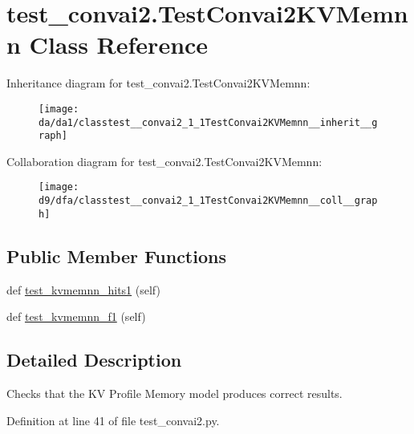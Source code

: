 \hypertarget{classtest__convai2_1_1TestConvai2KVMemnn}{}\section{test\+\_\+convai2.\+Test\+Convai2\+K\+V\+Memnn Class Reference}
\label{classtest__convai2_1_1TestConvai2KVMemnn}


Inheritance diagram for test\+\_\+convai2.\+Test\+Convai2\+K\+V\+Memnn\+:\nopagebreak
\begin{figure}[H]
\begin{center}
\leavevmode
\texttt{[image: da/da1/classtest\_\_convai2\_1\_1TestConvai2KVMemnn\_\_inherit\_\_graph]}
\end{center}
\end{figure}


Collaboration diagram for test\+\_\+convai2.\+Test\+Convai2\+K\+V\+Memnn\+:\nopagebreak
\begin{figure}[H]
\begin{center}
\leavevmode
\texttt{[image: d9/dfa/classtest\_\_convai2\_1\_1TestConvai2KVMemnn\_\_coll\_\_graph]}
\end{center}
\end{figure}
\subsection*{Public Member Functions}
\begin{DoxyCompactItemize}
\item 
def \hyperlink{classtest__convai2_1_1TestConvai2KVMemnn_a8d4b821e481c61a125658e0ac5045762}{test\+\_\+kvmemnn\+\_\+hits1} (self)
\item 
def \hyperlink{classtest__convai2_1_1TestConvai2KVMemnn_a85c9f140bc57a1f1e8b011a2034e74fc}{test\+\_\+kvmemnn\+\_\+f1} (self)
\end{DoxyCompactItemize}


\subsection{Detailed Description}
\begin{DoxyVerb}Checks that the KV Profile Memory model produces correct results.
\end{DoxyVerb}
 

Definition at line 41 of file test\+\_\+convai2.\+py.



